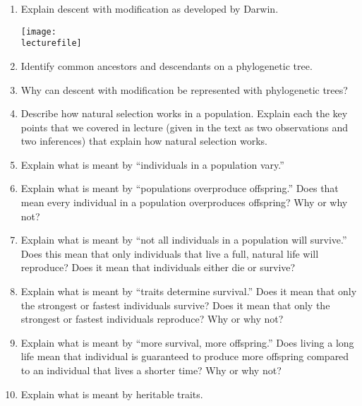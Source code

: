 \documentclass[letterpaper]{tufte-handout}
\newcommand\lecturefile{163_lecture02_fullsize}
\begin{document}
\begin{enumerate}

	\item Explain descent with modification as developed by Darwin. 
	\begin{marginfigure}
		\texttt{[image: \\lecturefile]}
	\end{marginfigure}

	\item Identify common ancestors and descendants on a phylogenetic tree.

	\item Why can descent with modification be represented with phylogenetic trees? 

	\item Describe how natural selection works in a population. Explain each the key points that we covered in lecture (given in the text as two observations and two inferences) that explain how natural selection works.

	\item\label{nsOne} Explain what is meant by ``individuals in a population vary.''

	\item Explain what is meant by ``populations overproduce offspring.'' Does that mean every individual in a population overproduces offspring? Why or why not?

	\item Explain what is meant by ``not all individuals in a population will survive.'' Does this mean that only individuals that live a full, natural life will reproduce? Does it mean that individuals either die or survive?

	\item Explain what is meant by ``traits determine survival.'' Does it mean that only the strongest or fastest individuals survive? Does it mean that only the strongest or fastest individuals reproduce? Why or why not?

	\item\label{nsFour} Explain what is meant by ``more survival, more offspring.'' Does living a long life mean that individual is guaranteed to produce more offspring compared to an individual that lives a shorter time? Why or why not? 

	\item Explain what is meant by heritable traits.


\end{enumerate}
\end{document}
